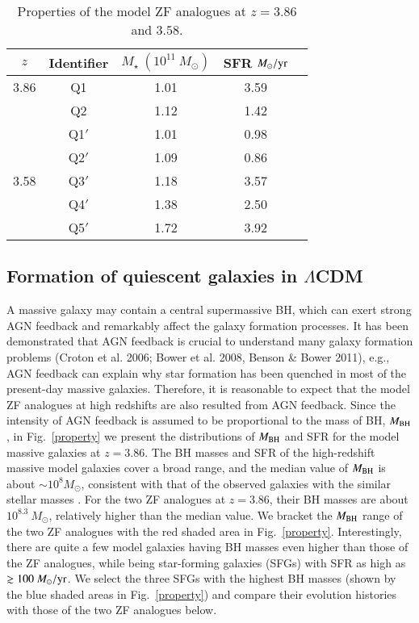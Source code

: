 \documentclass[useAMS,usenatbib]{mn2e}
\begin{document}
\begin{table} \center \normalsize
\begin{tabular}{@{}ccccc@{}}
\hline
\hline
$z$ & Identifier & $M_{\star}\ (10^{11}\ M_{\odot})$ & SFR $M_{\odot}/\rm{yr}$\\
\hline
3.86 & Q1 & 1.01 & 3.59  \\ 
     & Q2 & 1.12 & 1.42  \\
\hline
     & Q1$'$ & 1.01 & 0.98 \\ 
     & Q2$'$ & 1.09 & 0.86 \\
3.58 & Q3$'$ & 1.18 & 3.57  \\ 
     & Q4$'$ & 1.38 & 2.50  \\	
	 & Q5$'$ & 1.72 & 3.92  \\	 
\hline
\hline
\end{tabular}
\caption{Properties of the model ZF analogues at $z=3.86$ and $3.58$.}
\label{infor}
\end{table}

\subsection{Formation of quiescent galaxies in $\Lambda$CDM}

A massive galaxy may contain a central supermassive BH, which can exert strong AGN feedback and remarkably affect the galaxy formation processes. It has been demonstrated that AGN feedback is crucial to understand many galaxy formation problems (Croton et al. 2006; Bower et al. 2008, Benson \& Bower 2011), e.g., AGN feedback can explain why star formation has been quenched in most of the present-day massive galaxies. Therefore, it is reasonable to expect that the model ZF analogues at high redshifts are also resulted from AGN feedback. Since the intensity of AGN feedback is assumed to be proportional to the mass of BH, $M_{\rm{BH}}$, in Fig.~\ref{property} we present the distributions of $M_{\rm{BH}}$ and SFR for the model massive galaxies at $z=3.86$. The BH masses and SFR of the high-redshift massive model galaxies cover a broad range, and the median value of $M_{\rm{BH}}$ is about $\sim 10^8 M_{\odot}$, consistent with that of the observed galaxies with the similar stellar masses \citep[e.g.,][]{Lauer07,Gultekin09,Sani11,Trakhtenbrot15}. For the two ZF analogues at $z=3.86$, their BH masses are about $10^{8.3}\ M_{\odot}$, relatively higher than the median value. We bracket the $M_{\rm{BH}}$ range of the two ZF analogues with the red shaded area in Fig.~\ref{property}. Interestingly, there are quite a few model galaxies having BH masses even higher than those of the ZF analogues, while being star-forming galaxies (SFGs) with SFR as high as $\gtrsim 100\ M_{\odot}/\rm{yr}$. We select the three SFGs with the highest BH masses (shown by the blue shaded areas in Fig.~\ref{property}) and compare their evolution histories with those of the two ZF analogues below. 
\end{document}
